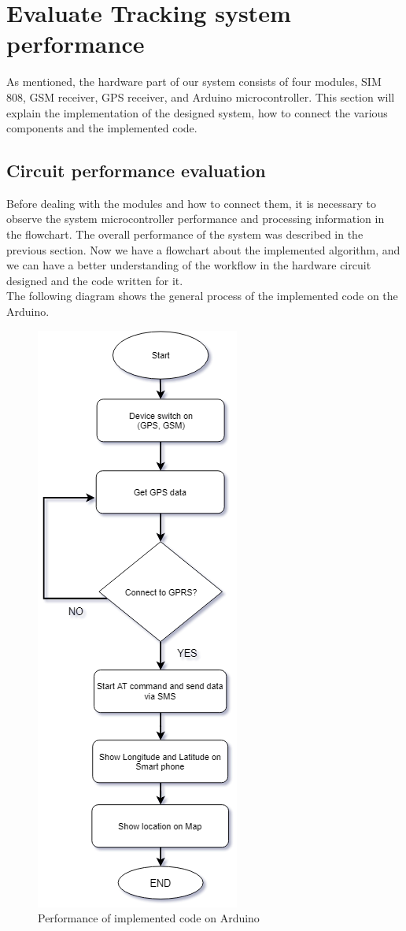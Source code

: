 \section{Evaluate Tracking system performance}
As mentioned, the hardware part of our system consists of four modules, SIM 808, GSM receiver, GPS receiver, and Arduino microcontroller. This section will explain the implementation of the designed system, how to connect the various components and the implemented code.
\subsection{Circuit performance evaluation}
Before dealing with the modules and how to connect them, it is necessary to observe the system microcontroller performance and processing information in the flowchart. The overall performance of the system was described in the previous section. Now we have a flowchart about the implemented algorithm, and we can have a better understanding of the workflow in the hardware circuit designed and the code written for it.\\
The following diagram shows the general process of the implemented code on the Arduino.
\begin{figure}[h!]
	\centering
	\includegraphics[width=.4\textwidth]{tracking-flowchart}
	\caption{Performance of implemented code on Arduino \cite{3}}
\end{figure}
